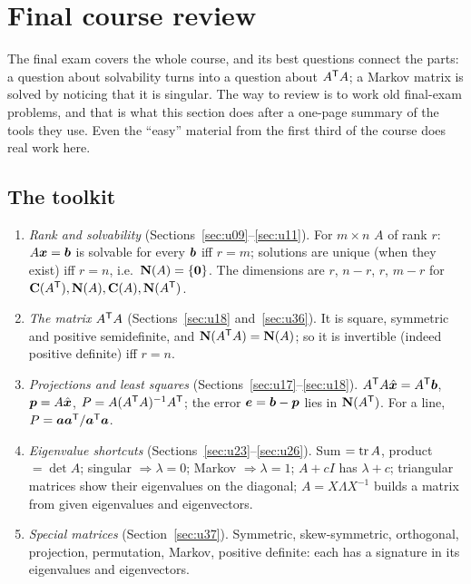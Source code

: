 \section{Final course review}\label{sec:u39}

The final exam covers the whole course, and its best questions connect the parts: a question about solvability turns into a question about $A^{\mathsf{T}} A$; a Markov matrix is solved by noticing that it is singular. The way to review is to work old final-exam problems, and that is what this section does after a one-page summary of the tools they use. Even the ``easy'' material from the first third of the course does real work here.

\subsection{The toolkit}

\begin{enumerate}[(1)]
\item \emph{Rank and solvability} (Sections~\ref{sec:u09}--\ref{sec:u11}). For $m\times n$ $A$ of rank $r$: $A\boldsymbol{x}=\boldsymbol{b}$ is solvable for every $\boldsymbol{b}$ iff $r=m$; solutions are unique (when they exist) iff $r=n$, i.e.\ $\mathbf{N}(A)=\{\boldsymbol{0}\}$. The dimensions are $r$, $n-r$, $r$, $m-r$ for $\mathbf{C}(A^{\mathsf{T}}),\mathbf{N}(A),\mathbf{C}(A),\mathbf{N}(A^{\mathsf{T}})$.
\item \emph{The matrix $A^{\mathsf{T}} A$} (Sections~\ref{sec:u18} and~\ref{sec:u36}). It is square, symmetric and positive semidefinite, and $\mathbf{N}(A^{\mathsf{T}} A)=\mathbf{N}(A)$; so it is invertible (indeed positive definite) iff $r=n$.
\item \emph{Projections and least squares} (Sections~\ref{sec:u17}--\ref{sec:u18}). $A^{\mathsf{T}} A\hat{\boldsymbol{x}}=A^{\mathsf{T}}\boldsymbol{b}$, $\boldsymbol{p}=A\hat{\boldsymbol{x}}$, $P=A(A^{\mathsf{T}} A)^{-1}A^{\mathsf{T}}$; the error $\boldsymbol{e}=\boldsymbol{b}-\boldsymbol{p}$ lies in $\mathbf{N}(A^{\mathsf{T}})$. For a line, $P=\boldsymbol{a}\boldsymbol{a}^{\mathsf{T}}/\boldsymbol{a}^{\mathsf{T}}\boldsymbol{a}$.
\item \emph{Eigenvalue shortcuts} (Sections~\ref{sec:u23}--\ref{sec:u26}). Sum $=\operatorname{tr} A$, product $=\det A$; singular $\Rightarrow\lambda=0$; Markov $\Rightarrow\lambda=1$; $A+cI$ has $\lambda+c$; triangular matrices show their eigenvalues on the diagonal; $A=X\Lambda X^{-1}$ builds a matrix from given eigenvalues and eigenvectors.
\item \emph{Special matrices} (Section~\ref{sec:u37}). Symmetric, skew-symmetric, orthogonal, projection, permutation, Markov, positive definite: each has a signature in its eigenvalues and eigenvectors.
\end{enumerate}

